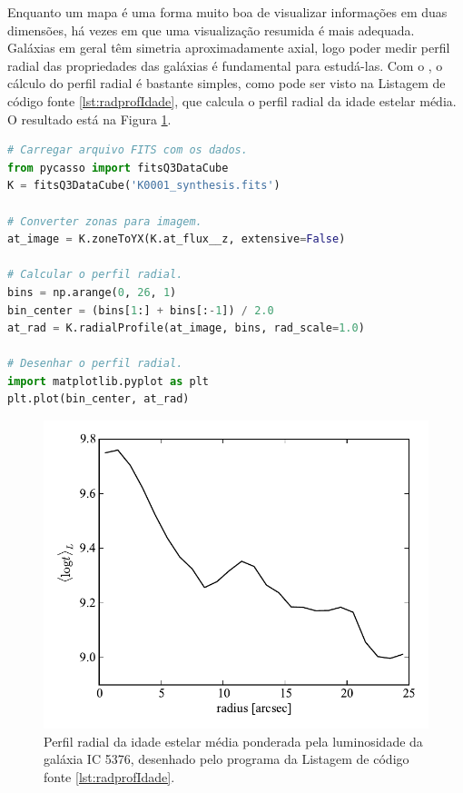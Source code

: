 Enquanto um mapa é uma forma muito boa de visualizar informações em duas
dimensões, há vezes em que uma visualização resumida é mais adequada. Galáxias
em geral têm simetria aproximadamente axial, logo poder medir perfil radial das
propriedades das galáxias é fundamental para estudá-las. Com o \pycasso, o
cálculo do perfil radial é bastante simples, como pode ser visto na Listagem de
código fonte \ref{lst:radprofIdade}, que calcula o perfil radial da idade
estelar média. O resultado está na Figura \ref{fig:radprofIdade}.

\begin{lstlisting}[language=Python, caption={Programa para desenhar o perfil
radial da idade estelar média ponderada pela luminosidade.},
label={lst:radprofIdade}]
# Carregar arquivo FITS com os dados.
from pycasso import fitsQ3DataCube
K = fitsQ3DataCube('K0001_synthesis.fits')

# Converter zonas para imagem.
at_image = K.zoneToYX(K.at_flux__z, extensive=False)

# Calcular o perfil radial.
bins = np.arange(0, 26, 1)
bin_center = (bins[1:] + bins[:-1]) / 2.0
at_rad = K.radialProfile(at_image, bins, rad_scale=1.0)

# Desenhar o perfil radial.
import matplotlib.pyplot as plt
plt.plot(bin_center, at_rad)
\end{lstlisting}

\begin{figure}
	\includegraphics{figuras/radprof-idade}
	\caption[Perfil radial da idade estelar média da galáxia IC 5376] {Perfil
	radial da idade estelar média ponderada pela luminosidade da galáxia IC
	5376, desenhado pelo programa da Listagem de código fonte
	\ref{lst:radprofIdade}.}
	\label{fig:radprofIdade}
\end{figure}


